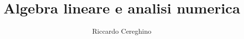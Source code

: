 \documentclass[12pt,twoside]{mitthesis}
\begin{document}
\newtheorem{alg}{Algoritmo}
\newtheorem{theo}{Teorema}
\newtheorem{theorem}{Teorema}
\newtheorem{defn}{Definizione}
\newtheorem{dimo}{Dimostrazione}
\newtheorem{coro}{Corollario}
\newtheorem{prop}{Proposizione}

\title{Algebra lineare e analisi numerica}

\author{Riccardo Cereghino}
\pagestyle{plain}













%
\end{document}
